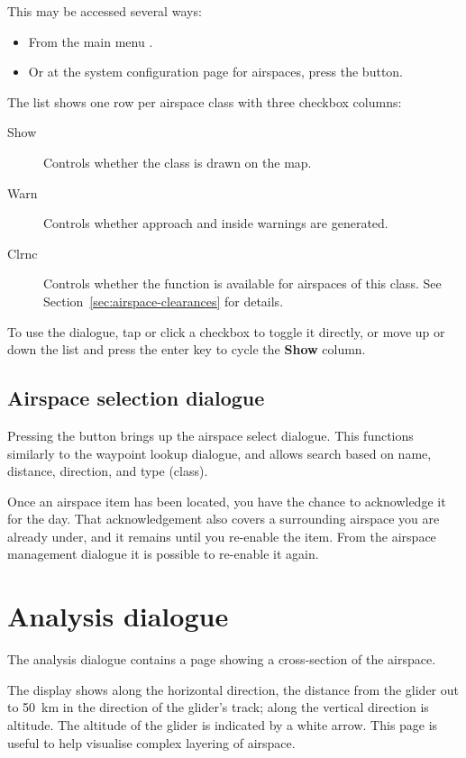 This may be accessed several ways:
\begin{itemize}
\item From the main menu \blink{}.
\item Or at the system configuration page for airspaces, press the  button.
\end{itemize}

The list shows one row per airspace class with three checkbox columns:
\begin{description}
\item[Show]  Controls whether the class is drawn on the map.
\item[Warn]  Controls whether approach and inside warnings are generated.
\item[Clrnc] Controls whether the  function is
  available for airspaces of this class.  See
  Section~\ref{sec:airspace-clearances} for details.
\end{description}
To use the dialogue, tap or click a checkbox to toggle it directly, or
move up or down the list and press the enter key to cycle the
\textbf{Show} column.

\subsection*{Airspace selection dialogue}

Pressing the  button brings up the airspace select dialogue.
This functions similarly to the waypoint lookup dialogue, and allows
search based on name, distance, direction, and type (class).  

Once an airspace item has been located, you have the chance to acknowledge it
for the day.  That acknowledgement also covers a surrounding airspace
you are already under, and it remains until you re-enable the item.
From the
airspace management dialogue it is possible to re-enable it again.


\section{Analysis dialogue}

The analysis dialogue contains a page showing a cross-section of the
airspace. 

The display shows along the horizontal direction, the
distance from the glider out to 50~km in the direction of the glider's
track; along the vertical direction is altitude.  The altitude of the
glider is indicated by a white arrow.  This page is useful to help
visualise complex layering of airspace.

